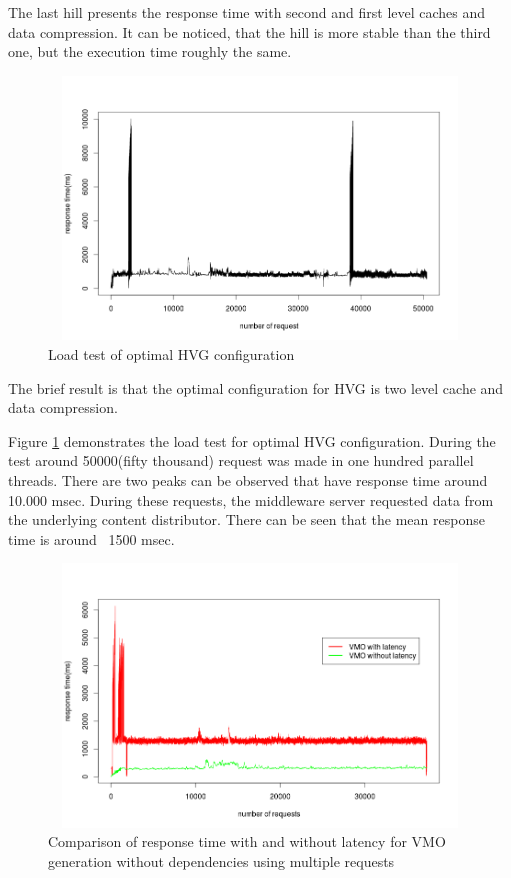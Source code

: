 The last hill presents the response time with second and first level caches and data compression. It can be noticed, that the hill is more stable than the third one, but the execution time roughly the same.


\begin{figure}[h!]
    \centering
    \includegraphics[width=15cm,height=7cm,keepaspectratio]{images/hql_loadtest.png}
    \caption{Load test of optimal HVG configuration}
    \label{fig:hvg_loadtest}
\end{figure}

The brief result is that the optimal configuration for HVG is two level cache and data compression.


Figure \ref{fig:hvg_loadtest} demonstrates the load test for optimal HVG configuration. During the test around 50000(fifty thousand) request was made in one hundred parallel threads. There are two peaks can be observed that have response time around 10.000 msec. During these requests, the middleware server requested data from the underlying content distributor. There can be seen that the mean response time is around ~1500 msec.


\begin{figure}[h!]
    \centering
    \includegraphics[width=15cm,height=7cm,keepaspectratio]{images/vmo_parallel_comparison.png}
    \caption{Comparison of response time with and without latency for VMO generation without dependencies using multiple requests}
    \label{fig:vmo_comparison}
\end{figure}

